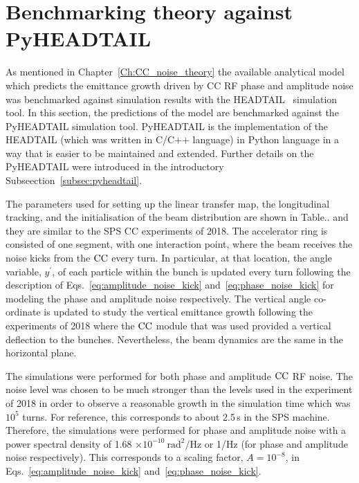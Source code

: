 \section{Benchmarking theory against PyHEADTAIL}\label{sec:benchmark_theory_with_pyheadtail}

As mentioned in Chapter~\ref{Ch:CC_noise_theory} the available analytical model which predicts the emittance growth driven by CC RF phase and amplitude noise was benchmarked against simulation results with the HEADTAIL~\cite{PhysRevSTAB.18.101001} simulation tool. In this section, the predictions of the model are benchmarked against the PyHEADTAIL simulation tool. PyHEADTAIL is the implementation of the HEADTAIL (which was written in C/C++ language) in Python language in a way that is easier to be maintained and extended. Further details on the PyHEADTAIL were introduced in the introductory Subseection~\ref{subsec:pyheadtail}.

The parameters used for setting up the linear transfer map, the longitudinal tracking, and the initialisation of the beam distribution are shown in Table.. and they are similar to the SPS CC experiments of 2018. The accelerator ring is consisted of one segment, with one interaction point, where the beam receives the noise kicks from the ${\mathrm{CC}}$ every turn. In particular, at that location, the angle variable, $y^\prime$, of each particle within the bunch is updated every turn following the description of Eqs.~\eqref{eq:amplitude_noise_kick} and~\eqref{eq:phase_noise_kick} for modeling the phase and amplitude noise respectively. The vertical angle co-ordinate is updated to study the vertical emittance growth following the experiments of 2018 where the ${\mathrm{CC}}$ module that was used provided a vertical deflection to the bunches. Nevertheless, the beam dynamics are the same in the horizontal plane.

The simulations were performed for both phase and amplitude ${\mathrm{CC}}$ RF noise. The noise level was chosen to be much stronger than the levels used in the experiment of 2018 in order to observe a reasonable growth in the simulation time which was $10^5$ turns. For reference, this corresponds to about 2.5\,s in the SPS machine. Therefore, the simulations were performed for phase and amplitude noise with a power spectral density of 1.68 $\times 10^{-10} \ \mathrm{rad^2/Hz}$ or 1/Hz (for phase and amplitude noise respectively). This corresponds to a scaling factor, $A=10^{-8}$, in Eqs.~\eqref{eq:amplitude_noise_kick} and~\eqref{eq:phase_noise_kick}. 

